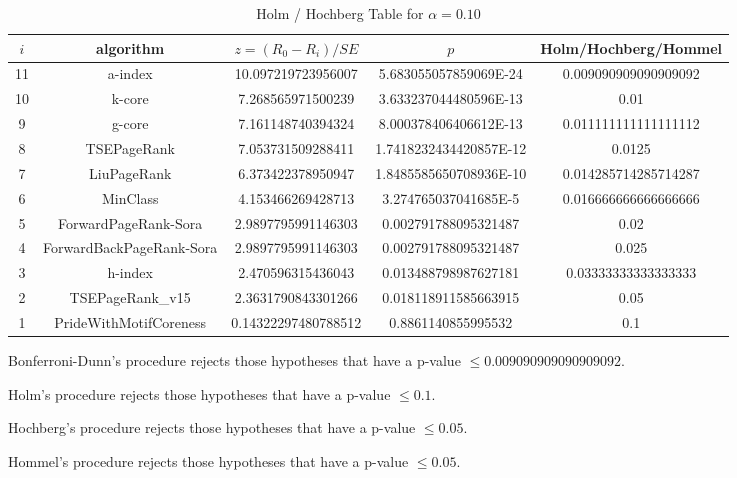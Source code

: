 \documentclass[a4paper,10pt]{article}
\begin{document}
\begin{landscape}
\begin{table}[!htp]
\centering\tiny
\caption{Holm / Hochberg Table for $\alpha=0.10$}
\begin{tabular}{ccccc}
$i$&algorithm&$z=(R_0 - R_i)/SE$&$p$&Holm/Hochberg/Hommel\\
\hline
11&a-index&10.097219723956007&5.683055057859069E-24&0.009090909090909092\\
10&k-core&7.268565971500239&3.633237044480596E-13&0.01\\
9&g-core&7.161148740394324&8.000378406406612E-13&0.011111111111111112\\
8&TSEPageRank&7.053731509288411&1.7418232434420857E-12&0.0125\\
7&LiuPageRank&6.373422378950947&1.8485585650708936E-10&0.014285714285714287\\
6&MinClass&4.153466269428713&3.274765037041685E-5&0.016666666666666666\\
5&ForwardPageRank-Sora&2.9897795991146303&0.002791788095321487&0.02\\
4&ForwardBackPageRank-Sora&2.9897795991146303&0.002791788095321487&0.025\\
3&h-index&2.470596315436043&0.013488798987627181&0.03333333333333333\\
2&TSEPageRank_v15&2.3631790843301266&0.018118911585663915&0.05\\
1&PrideWithMotifCoreness&0.14322297480788512&0.8861140855995532&0.1\\
\hline
\end{tabular}
\end{table}
Bonferroni-Dunn's procedure rejects those hypotheses that have a p-value $\le0.009090909090909092$.


Holm's procedure rejects those hypotheses that have a p-value $\le0.1$.


Hochberg's procedure rejects those hypotheses that have a p-value $\le0.05$.


Hommel's procedure rejects those hypotheses that have a p-value $\le0.05$.



\end{landscape}
\end{document}
